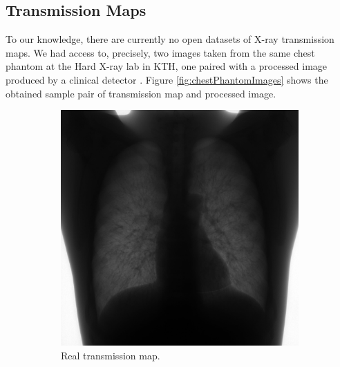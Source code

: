 \documentclass[nomenclature, english, bibtex]{kththesis}
\numberwithin{listing}{chapter}
\begin{document}
\subsection{Transmission Maps}

To our knowledge, there are currently no open datasets of X-ray transmission maps.
We had access to, precisely, two images taken from the same chest phantom at the Hard X-ray lab in KTH, one paired with a processed
image produced by a clinical detector . Figure \ref{fig:chestPhantomImages} shows the obtained sample pair of transmission map and
processed image.

\begin{figure}[H]
    \centering
    \begin{subfigure}[t]{0.45\textwidth}
        \includegraphics[width=\textwidth]{figures/comm_unprocessed_sample.jpg}
        \caption{Real transmission map.}
    \end{subfigure}
    \begin{subfigure}[t]{0.45\textwidth}

\end{subfigure}
\end{figure}
\end{document}
